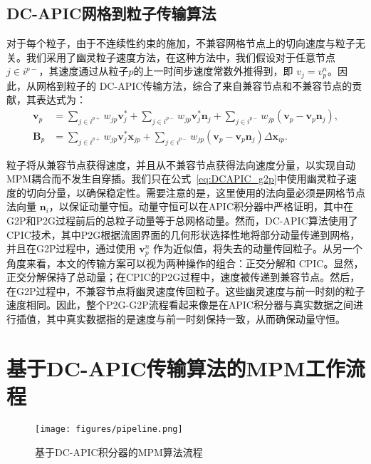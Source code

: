 \subsection{DC-APIC网格到粒子传输算法} \label{sec:DC-APIC_g2p}
对于每个粒子，由于不连续性约束的施加，不兼容网格节点上的切向速度与粒子无关。我们采用了幽灵粒子速度方法，在这种方法中，我们假设对于任意节点 $j\in i^{p-}$，其速度通过从粒子$p$的上一时间步速度常数外推得到，即 $v_j=v_p^n$。因此，从网格到粒子的 DC-APIC传输方法，综合了来自兼容节点和不兼容节点的贡献，其表达式为：
\begin{equation}
    \label{eq:DCAPIC_g2p}
    \begin{aligned}
        \mathbf{v}_p &=\sum_{j\in i^{p+}}w_{jp}\mathbf{v}_j^* + \sum_{j\in i^{p-}}w_{jp}\mathbf{v}_j^*\mathbf{n}_j + \sum_{j\in i^{p-}}w_{jp}(\mathbf{v}_p-\mathbf{v}_p\mathbf{n}_j), \\
        \mathbf{B}_p &= \sum_{j\in i^{p+}}w_{jp}\mathbf{v}_j^*\mathbf{x}_{jp} + \sum_{j\in i^{p-}}w_{jp}(\mathbf{v}_p-\mathbf{v}_p\mathbf{n}_j)\Delta\mathbf{x}_{ip}.
    \end{aligned}
\end{equation}

粒子将从兼容节点获得速度，并且从不兼容节点获得法向速度分量，以实现自动MPM耦合而不发生自穿插。我们只在公式~\eqref{eq:DCAPIC_g2p}中使用幽灵粒子速度的切向分量，以确保稳定性。需要注意的是，这里使用的法向量必须是网格节点法向量 $\mathbf{n}_i$，以保证动量守恒。动量守恒可以在APIC积分器中严格证明，其中在G2P和P2G过程前后的总粒子动量等于总网格动量。然而，DC-APIC算法使用了CPIC技术，其中P2G根据流固界面的几何形状选择性地将部分动量传递到网格，并且在G2P过程中，通过使用 $\mathbf{v}_p^n$ 作为近似值，将失去的动量传回粒子。从另一个角度来看，本文的传输方案可以视为两种操作的组合：正交分解和 CPIC。显然，正交分解保持了总动量；在CPIC的P2G过程中，速度被传递到兼容节点。然后，在G2P过程中，不兼容节点将幽灵速度传回粒子。这些幽灵速度与前一时刻的粒子速度相同。因此，整个P2G-G2P流程看起来像是在APIC积分器与真实数据之间进行插值，其中真实数据指的是速度与前一时刻保持一致，从而确保动量守恒。

\section{基于DC-APIC传输算法的MPM工作流程}
\begin{figure*}[htbp]
\centering
\texttt{[image: figures/pipeline.png]}
\caption{基于DC-APIC积分器的MPM算法流程} 
\label{fig:pipeline}
\end{figure*}

